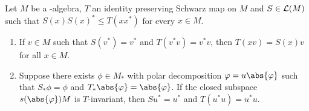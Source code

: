 \begin{lemma}\label{lem:d3-1.2}
Let $M$ be a \WA-algebra, $T$ an identity preserving Schwarz map on $M$ and $S\in\mathcal{L}(M)$ such that $S(x)S(x)^{*} \leq T(xx^{*})$ for every $x\in M$.
\begin{enumerate}[\upshape (i)]

\item\label{item:d3-1.2-i}
If\/ $v\in M$ such that $S(v^{*}) = v^{*}$ and $T(v^{*}v) = v^{*}v$, then $T(xv) = S(x)v$ for all $x\in M$.

\item\label{item:d3-1.2-ii}
Suppose there exists $\phi\in M_{*}$ with polar decomposition $\phi = u\abs{\phi}$ such that $S_{*}\phi = \phi$ and $T_{*}\abs{\phi} = \abs{\phi}$.
If the closed subspace $s(\abs{\phi})M$ is $T$-invariant, then $Su^{*} = u^{*}$ and $T(u^{*}u) = u^{*}u$.
\end{enumerate}
\end{lemma}
